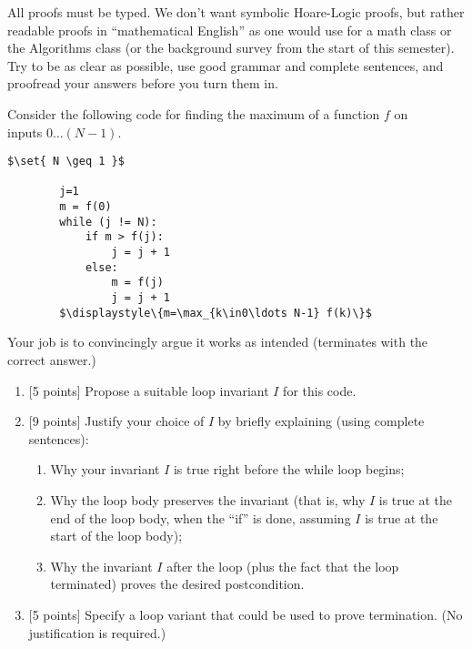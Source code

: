 \documentclass[12pt,letterpaper,boxed,cm]{hmcpset}
\newcommand{\set}[1]{\left\{#1\right\}}
\begin{document}
All proofs must be typed. We don't want symbolic Hoare-Logic proofs, but rather readable proofs in “mathematical English” as one would use for a math class or the Algorithms class (or the background survey from the start of this semester). Try to be as clear as possible, use good grammar and complete sentences, and proofread your answers before you turn them in.\\

\begin{problem}[1.] 
    [19 points] Consider the following code for finding the maximum of a function $f$ on\\
     inputs $0\ldots(N-1)$.
    \begin{lstlisting}[mathescape]
        $\set{ N \geq 1 }$

        j=1
        m = f(0)
        while (j != N):
            if m > f(j): 
                j = j + 1
            else:
                m = f(j)
                j = j + 1
        $\displaystyle\{m=\max_{k\in0\ldots N-1} f(k)\}$
    \end{lstlisting}
    Your job is to convincingly argue it works as intended (terminates with the correct answer.)
    \begin{enumerate}[label=\Alph*.]
        \item {[5 points]} Propose a suitable loop invariant $I$ for this code.
        \item {[9 points]} Justify your choice of $I$ by briefly explaining (using complete sentences):
        \begin{enumerate}[label=\alph*.]
            \item Why your invariant $I$ is true right before the while loop begins;
            \item Why the loop body preserves the invariant (that is, why $I$ is true at the end of the loop body, when the ``if'' is done, assuming $I$ is true at the start of the loop body);
            \item Why the invariant $I$ after the loop (plus the fact that the loop terminated) proves the desired postcondition.
        \end{enumerate}
        \item {[5 points]} Specify a loop variant that could be used to prove termination. (No justification is required.)
    \end{enumerate}
\end{problem}

\begin{solution}
    \vfill
\end{solution}
\newpage
\end{document}
